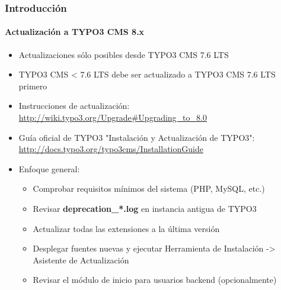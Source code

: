 \begin{frame}[fragile]
	\frametitle{Introducción}
	\framesubtitle{Actualización a TYPO3 CMS 8.x}

	\begin{itemize}
		\item Actualizaciones sólo posibles desde TYPO3 CMS 7.6 LTS
		\item TYPO3 CMS < 7.6 LTS debe ser actualizado a TYPO3 CMS 7.6 LTS primero
	\end{itemize}

	\begin{itemize}

		\item Instrucciones de actualización:\newline
			\smaller\url{http://wiki.typo3.org/Upgrade#Upgrading_to_8.0}\normalsize
		\item Guía oficial de TYPO3 "Instalación y Actualización de TYPO3":
			\smaller\url{http://docs.typo3.org/typo3cms/InstallationGuide}\normalsize
		\item Enfoque general:
			\begin{itemize}
				\item Comprobar requisitos mínimos del sistema \small(PHP, MySQL, etc.)
				\item Revisar \textbf{deprecation\_*.log} en instancia antigua de TYPO3
				\item Actualizar todas las extensiones a la última versión
				\item Desplegar fuentes nuevas y ejecutar Herramienta de Instalación -> Asistente de Actualización
				\item Revisar el módulo de inicio para usuarios backend (opcionalmente)
			\end{itemize}
	\end{itemize}

\end{frame}


